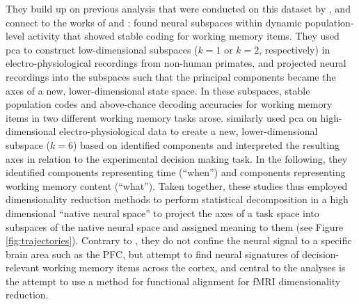 They build up on previous analysis that were conducted on this dataset by \citet{kaiserposter}, and connect to the works of \citet{murray2017stable} and \citet{machens2010functional}:
\citet{murray2017stable} found neural subspaces within dynamic population-level activity that showed stable coding for working memory items. They used \gls{pca} to construct low-dimensional subspaces ($k = 1$ or $k = 2$, respectively) in electro-physiological recordings from non-human primates, and projected neural recordings into the subspaces such that the principal components became the axes of a new, lower-dimensional state space. In these subspaces, stable population codes and above-chance decoding accuracies for working memory items in two different working memory tasks arose.
\citet{machens2010functional} similarly used \gls{pca} on high-dimensional electro-physiological data to create a new, lower-dimensional subspace ($k = 6$) based on identified components and interpreted the resulting axes in relation to the experimental decision making task.
In the following, they identified components representing time (``when'') and components representing working memory content (``what'').
Taken together, these studies thus employed dimensionality reduction methods to perform statistical decomposition in a high dimensional ``native neural space'' to project the axes of a task space into subspaces of the native neural space and assigned meaning to them (see Figure \ref{fig:trajectories}).
Contrary to \citet{murray2017stable, machens2010functional}, they do not confine the neural signal to a specific brain area such as the PFC, but attempt to find neural signatures of decision-relevant working memory items across the cortex, and central to the analyses is the attempt to use a method for functional alignment for \gls{fMRI}  dimensionality reduction.








